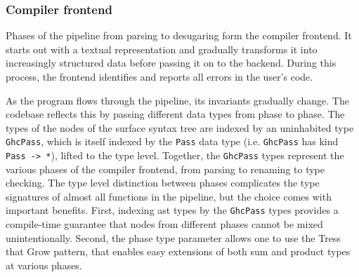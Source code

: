\documentclass[thesis=B,english]{FITthesis}[2019/12/23]
\newcommand{\hsType}[1]{\texttt{#1}}
\begin{document}
\subsubsection*{Compiler frontend}
Phases of the pipeline from parsing to desugaring form the compiler frontend.
It starts out with a textual representation and gradually transforms it into
increasingly structured data before passing it on to the backend. During this
process, the frontend identifies and reports all errors in the user's code.

As the program flows through the pipeline, its invariants gradually change. The
codebase reflects this by passing different data types from phase to phase. The
types of the nodes of the surface syntax tree are indexed by an uninhabited
type \hsType{GhcPass}, which is itself indexed by the \hsType{Pass} data type
(i.e. \hsType{GhcPass} has kind \hsType{Pass -> *}), lifted to the type level.
Together, the \hsType{GhcPass} types represent the various phases of the
compiler frontend, from parsing to renaming to type checking. The type level
distinction between phases complicates the type signatures of almost all
functions in the pipeline, but the choice comes with important benefits.
First, indexing \acrshort{ast} types by the \hsType{GhcPass} types provides a
compile-time guarantee that nodes from different phases cannot be mixed
unintentionally. Second, the phase type parameter allows one to use the Tress
that Grow pattern\cite{trees-that-grow}, that enables easy extensions of both
sum and product types at various phases.
\end{document}
